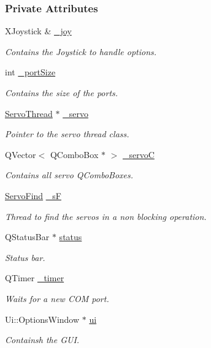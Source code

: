 \subsubsection*{Private Attributes}
\begin{DoxyCompactItemize}
\item 
X\+Joystick \& \hyperlink{a00006_a1bf846ab681ab245f70adac30999947c}{\+\_\+joy}
\begin{DoxyCompactList}\small\item\em Contains the Joystick to handle options. \end{DoxyCompactList}\item 
int \hyperlink{a00006_a9bd4dccc7a544b1db78dc8cf330b88f6}{\+\_\+port\+Size}
\begin{DoxyCompactList}\small\item\em Contains the size of the ports. \end{DoxyCompactList}\item 
\hyperlink{a00009}{Servo\+Thread} $\ast$ \hyperlink{a00006_acba1566fea3f831000d5e1c1edc3e776}{\+\_\+servo}
\begin{DoxyCompactList}\small\item\em Pointer to the servo thread class. \end{DoxyCompactList}\item 
Q\+Vector$<$ Q\+Combo\+Box $\ast$ $>$ \hyperlink{a00006_a45137fbf71bbee10e171019c913b88b7}{\+\_\+servo\+C}
\begin{DoxyCompactList}\small\item\em Contains all servo Q\+Combo\+Boxes. \end{DoxyCompactList}\item 
\hyperlink{a00008}{Servo\+Find} \hyperlink{a00006_ab143e1d06250ec778309da1a3807b602}{\+\_\+s\+F}
\begin{DoxyCompactList}\small\item\em Thread to find the servos in a non blocking operation. \end{DoxyCompactList}\item 
Q\+Status\+Bar $\ast$ \hyperlink{a00006_af031403c7017cf086c0b85186c53471e}{status}
\begin{DoxyCompactList}\small\item\em Status bar. \end{DoxyCompactList}\item 
Q\+Timer \hyperlink{a00006_af6320942b8558140989f552b3bbc1fbd}{\+\_\+timer}
\begin{DoxyCompactList}\small\item\em Waits for a new C\+O\+M port. \end{DoxyCompactList}\item 
Ui\+::\+Options\+Window $\ast$ \hyperlink{a00006_a8347442d5b3b670e8fff0c4102db1f88}{ui}
\begin{DoxyCompactList}\small\item\em Containsh the G\+U\+I. \end{DoxyCompactList}\end{DoxyCompactItemize}


